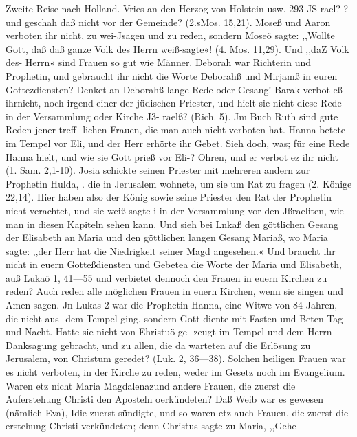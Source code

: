Zweite Reise nach Holland. Vries an den Herzog von Holstein usw. 293
JS-rael?-? und geschah daß nicht vor der Gemeinde? (2.sMos. 15,21).
Moseß und Aaron verboten ihr nicht, zu wei-Jsagen und zu reden,
sondern Moseö sagte: ,,Wollte Gott, daß daß ganze Volk des Herrn
weiß-sagte«! (4. Mos. 11,29). Und ,,daZ Volk des- Herrn« sind
Frauen so gut wie Männer. Deborah war Richterin und Prophetin,
und gebraucht ihr nicht die Worte Deborahß und Mirjamß in euren
Gottezdiensten? Denket an Deborahß lange Rede oder Gesang!
Barak verbot eß ihrnicht, noch irgend einer der jüdischen Priester, und
hielt sie nicht diese Rede in der Versammlung oder Kirche J3-
raelß? (Rich. 5). Jm Buch Ruth sind gute Reden jener treff-
lichen Frauen, die man auch nicht verboten hat. Hanna betete
im Tempel vor Eli, und der Herr erhörte ihr Gebet. Sieh doch,
was; für eine Rede Hanna hielt, und wie sie Gott prieß vor Eli-?
Ohren, und er verbot ez ihr nicht (1. Sam. 2,1-10). Josia
schickte seinen Priester mit mehreren andern zur Prophetin Hulda,
. die in Jerusalem wohnete, um sie um Rat zu fragen (2. Könige
22,14). Hier haben also der König sowie seine Priester
den Rat der Prophetin nicht verachtet, und sie weiß-sagte i
in der Versammlung vor den Jßraeliten, wie man in diesen
Kapiteln sehen kann.
Und sieh bei Lnkaß den göttlichen Gesang der Elisabeth an
Maria und den göttlichen langen Gesang Mariaß, wo Maria sagte:
,,der Herr hat die Niedrigkeit seiner Magd angesehen.« Und braucht
ihr nicht in euern Gotteßdiensten und Gebetea die Worte der
Maria und Elisabeth, auß Lukaö 1, 41—55 und verbietet dennoch
den Frauen in euern Kirchen zu reden? Auch reden alle möglichen
Frauen in euern Kirchen, wenn sie singen und Amen sagen. Jn
Lukas 2 war die Prophetin Hanna, eine Witwe von 84 Jahren,
die nicht aus- dem Tempel ging, sondern Gott diente mit Fasten
und Beten Tag und Nacht. Hatte sie nicht von Ehristuö ge-
zeugt im Tempel und dem Herrn Danksagung gebracht, und zu
allen, die da warteten auf die Erlösung zu Jerusalem, von
Christum geredet? (Luk. 2, 36—38). Solchen heiligen Frauen
war es nicht verboten, in der Kirche zu reden, weder im Gesetz
noch im Evangelium. Waren etz nicht Maria Magdalenazund
andere Frauen, die zuerst die Auferstehung Christi den Aposteln
oerkündeten? Daß Weib war es gewesen (nämlich Eva), Idie
zuerst sündigte, und so waren etz auch Frauen, die zuerst die  
erstehung Christi verkündeten; denn Christus sagte zu Maria, ,,Gehe


